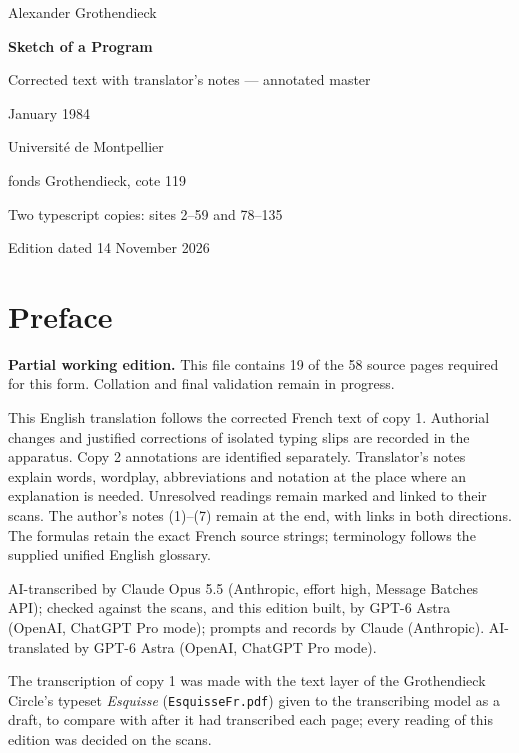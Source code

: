 \documentclass[11pt,a4paper]{article}
\newcommand{\EditionTitle}{Sketch of a Program}
\newcommand{\EditionForm}{Corrected text with translator’s notes — annotated master}
\begin{document}
\begin{titlepage}
\centering
\vspace*{18mm}
{\Large Alexander Grothendieck\par}
\vspace{12mm}
{\Huge\bfseries\EditionTitle\par}
\vspace{8mm}
{\Large\EditionForm\par}
\vspace{14mm}
{\large January 1984\par}
\vfill
{\large Université de Montpellier\par fonds Grothendieck, cote 119\par}
\vspace{8mm}
{\normalsize Two typescript copies: sites 2--59 and 78--135\par}
\vspace{8mm}
{\normalsize Edition dated 14 November 2026\par}
\end{titlepage}
\thispagestyle{plain}
\section*{Preface}
\noindent\textbf{Partial working edition.} This file contains 19 of the 58 source pages required for this form. Collation and final validation remain in progress.\par\smallskip
This English translation follows the corrected French text of copy 1. Authorial changes and justified corrections of isolated typing slips are recorded in the apparatus. Copy 2 annotations are identified separately. Translator’s notes explain words, wordplay, abbreviations and notation at the place where an explanation is needed. Unresolved readings remain marked and linked to their scans. The author’s notes (1)–(7) remain at the end, with links in both directions. The formulas retain the exact French source strings; terminology follows the supplied unified English glossary.

\smallskip
AI-transcribed by Claude Opus 5.5 (Anthropic, effort high, Message Batches API); checked against the scans, and this edition built, by GPT-6 Astra (OpenAI, ChatGPT Pro mode); prompts and records by Claude (Anthropic).
AI-translated by GPT-6 Astra (OpenAI, ChatGPT Pro mode).

The transcription of copy 1 was made with the text layer of the Grothendieck Circle's typeset \textit{Esquisse} (\texttt{EsquisseFr.pdf}) given to the transcribing model as a draft, to compare with after it had transcribed each page; every reading of this edition was decided on the scans.
\end{document}
